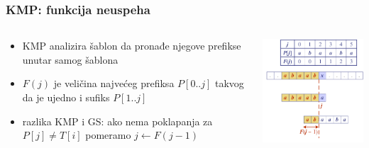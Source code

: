 \documentclass[compress]{beamer}
\begin{document}
\begin{frame}[fragile]
  \frametitle{KMP: funkcija neuspeha}
  \begin{columns}
    \begin{column}[t]{6cm}
      \begin{itemize}
        \item KMP analizira šablon da pronađe njegove prefikse unutar samog
        šablona
        \item {} $F(j)$ je veličina najvećeg prefiksa
        $P[0..j]$ takvog da je ujedno i sufiks $P[1..j]$
        \item razlika KMP i GS: ako nema poklapanja za $P[j] \neq T[i]$ pomeramo
        $j \leftarrow F(j-1)$
      \end{itemize}
    \end{column}
    \begin{column}[t]{6cm}
      \begin{center}
        \includegraphics[width=6cm]{asp-13-pic06.png}
      \end{center}
    \end{column}
  \end{columns}
\end{frame}
\end{document}
